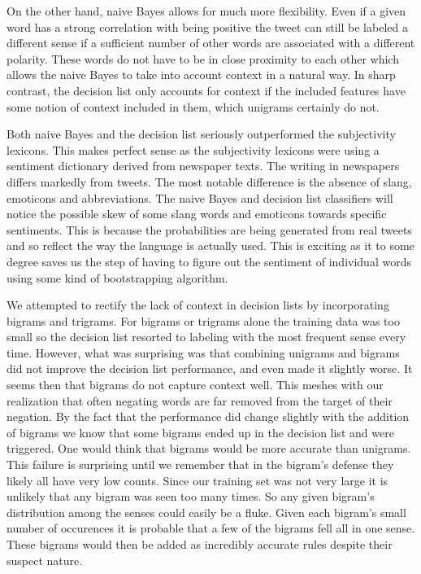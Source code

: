 \documentclass[11pt]{article}
\begin{document}
On the other hand, naive Bayes allows for much more flexibility. Even if a given word has a strong correlation with being positive the tweet can still be labeled a different sense if a sufficient number of other words are associated with a different polarity. These words do not have to be in close proximity to each other which allows the naive Bayes to take into account context in a natural way. In sharp contrast, the decision list only accounts for context if the included features have some notion of context included in them, which unigrams certainly do not.

Both naive Bayes and the decision list seriously outperformed the subjectivity lexicons. This makes perfect sense as the subjectivity lexicons were using a sentiment dictionary derived from newspaper texts. The writing in newspapers differs markedly from tweets. The most notable difference is the absence of slang, emoticons and abbreviations. The naive Bayes and decision list classifiers will notice the possible skew of some slang words and emoticons towards specific sentiments. This is because the probabilities are being generated from real tweets and so reflect the way the language is actually used. This is exciting as it to some degree saves us the step of having to figure out the sentiment of individual words using some kind of bootstrapping algorithm.

We attempted to rectify the lack of context in decision lists by incorporating bigrams and trigrams. For bigrams or trigrams alone the training data was too small so the decision list resorted to labeling with the most frequent sense every time. However, what was surprising was that combining unigrams and bigrams did not improve the decision list performance, and even made it slightly worse. It seems then that bigrams do not capture context well. This meshes with our realization that often negating words are far removed from the target of their negation. By the fact that the performance did change slightly with the addition of bigrams we know that some bigrams ended up in the decision list and were triggered. One would think that bigrams would be more accurate than unigrams. This failure is surprising until we remember that in the bigram's defense they likely all have very low counts. Since our training set was not very large it is unlikely that any bigram was seen too many times. So any given bigram's distribution among the senses could easily be a fluke. Given each bigram's small number of occurences it is probable that a few of the bigrams fell all in one sense. These bigrams would then be added as incredibly accurate rules despite their suspect nature.
\end{document}

